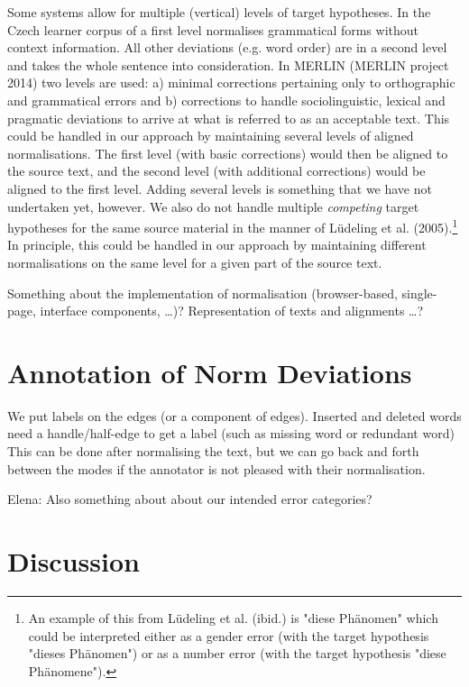 \documentclass[10pt, a4paper]{article}
\begin{document}
Some systems allow for multiple (vertical) levels of target hypotheses. In the Czech learner corpus of \cite{Hana2014} a
first level normalises grammatical forms without context information. All other deviations (e.g. word order) are in a second level and takes the whole sentence into consideration.
In MERLIN (MERLIN project 2014) two levels are used: a) minimal corrections pertaining only to orthographic and grammatical errors and b) corrections to handle sociolinguistic, lexical and pragmatic deviations to arrive at what is referred to as an acceptable text. This could be handled in our approach by maintaining several levels of aligned normalisations. The first level (with basic corrections) would then be aligned to the source text, and the second level (with additional corrections) would be aligned to the first level. Adding several levels is something that we have not undertaken yet, however. We also do not handle multiple {\em competing} target hypotheses for the same source material in the manner of L{\"u}deling et al. (2005).\footnote{An example of this from L{\"u}deling et al. (ibid.) is "diese Ph{\"a}nomen" which could be interpreted either as a gender error (with the target hypothesis "dieses Ph{\"a}nomen") or as a number error (with the target hypothesis "diese Ph{\"a}nomene").} In principle, this could be handled in our approach by maintaining different normalisations on the same level for a given part of the source text.

Something about the implementation of normalisation (browser-based, single-page, interface components, \ldots )? Representation of texts and alignments \ldots ?

\section{Annotation of Norm Deviations}


%
We put labels on the edges (or a component of edges). Inserted and deleted words need a handle/half-edge to get
a label (such as missing word or redundant word)
This can be done after normalising the text, but we can go back and forth between the modes if the
annotator is not pleased with their normalisation.
%

Elena: Also something about about our intended error categories?

\section{Discussion}
\end{document}

